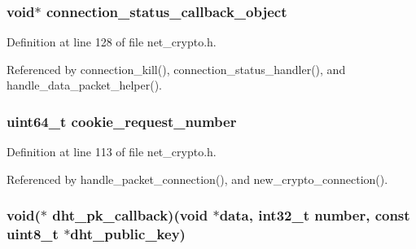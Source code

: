 \hypertarget{struct_crypto___connection_afe03d43c62ac2aa575a39e4308353244}{
\subsubsection[{connection\+\_\+status\+\_\+callback\+\_\+object}]{\setlength{\rightskip}{0pt plus 5cm}void$\ast$ connection\+\_\+status\+\_\+callback\+\_\+object}}\label{struct_crypto___connection_afe03d43c62ac2aa575a39e4308353244}


Definition at line 128 of file net\+\_\+crypto.\+h.



Referenced by connection\+\_\+kill(), connection\+\_\+status\+\_\+handler(), and handle\+\_\+data\+\_\+packet\+\_\+helper().

\hypertarget{struct_crypto___connection_acb77d5443961bf245b63c17347b1b030}{
\subsubsection[{cookie\+\_\+request\+\_\+number}]{\setlength{\rightskip}{0pt plus 5cm}uint64\+\_\+t cookie\+\_\+request\+\_\+number}}\label{struct_crypto___connection_acb77d5443961bf245b63c17347b1b030}


Definition at line 113 of file net\+\_\+crypto.\+h.



Referenced by handle\+\_\+packet\+\_\+connection(), and new\+\_\+crypto\+\_\+connection().

\hypertarget{struct_crypto___connection_ab0f780a41ece58bf84d8460e71cbdbb3}{
\subsubsection[{dht\+\_\+pk\+\_\+callback}]{\setlength{\rightskip}{0pt plus 5cm}void($\ast$ dht\+\_\+pk\+\_\+callback)(void $\ast$data, int32\+\_\+t number, const uint8\+\_\+t $\ast${\bf dht\+\_\+public\+\_\+key})}}\label{struct_crypto___connection_ab0f780a41ece58bf84d8460e71cbdbb3}


